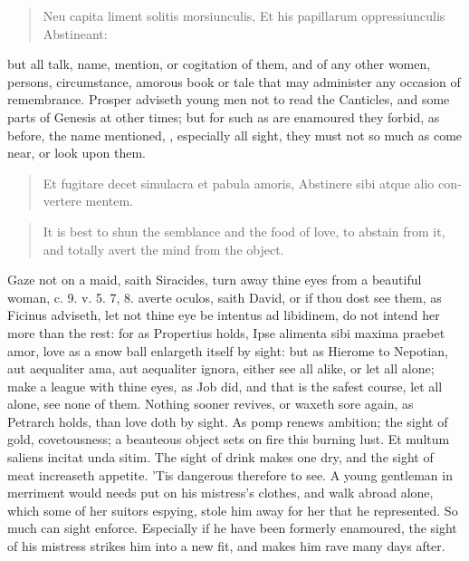 \begin{latin}
\begin{verse}
Neu capita liment solitis morsiunculis,
Et his papillarum oppressiunculis
Abstineant:
\end{verse}
\end{latin}

but all talk, name, mention, or cogitation of them, and of any other
women, persons, circumstance, amorous book or tale that may administer
any occasion of remembrance. Prosper adviseth young men not to
read the Canticles, and some parts of Genesis at other times; but for
such as are enamoured they forbid, as before, the name mentioned, \etc{},
especially all sight, they must not so much as come near, or look upon
them.

\begin{latin}
\begin{verse}
Et fugitare decet simulacra et pabula amoris,
Abstinere sibi atque alio convertere mentem.
\end{verse}
\end{latin}
\translationrule%
\begin{verse}%
It is best to shun the semblance and the food of love,
to abstain from it, and totally avert the mind from the object.
\end{verse}%

Gaze not on a maid, saith Siracides, turn away thine eyes from a
beautiful woman, c. 9. v. 5. 7, 8. averte oculos, saith David, or if
thou dost see them, as Ficinus adviseth, let not thine eye be intentus
ad libidinem, do not intend her more than the rest: for as
Propertius holds, Ipse alimenta sibi maxima praebet amor, love as
a snow ball enlargeth itself by sight: but as Hierome to Nepotian, aut
aequaliter ama, aut aequaliter ignora, either see all alike, or let all
alone; make a league with thine eyes, as Job did, and that is the
safest course, let all alone, see none of them. Nothing sooner revives,
or waxeth sore again, as Petrarch holds, than love doth by sight.
As pomp renews ambition; the sight of gold, covetousness; a beauteous
object sets on fire this burning lust. Et multum saliens incitat unda
sitim. The sight of drink makes one dry, and the sight of meat
increaseth appetite. 'Tis dangerous therefore to see. A young
gentleman in merriment would needs put on his mistress's clothes, and
walk abroad alone, which some of her suitors espying, stole him away
for her that he represented. So much can sight enforce. Especially if
he have been formerly enamoured, the sight of his mistress strikes him
into a new fit, and makes him rave many days after.

